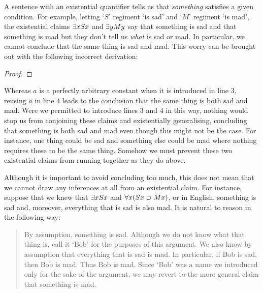 A sentence with an existential quantifier tells us that \textit{something} satisfies a given condition.
For example, letting `$S$' regiment `is sad' and `$M$' regiment `is mad', the existential claims $\exists x Sx$ and $\exists y My$ say that something is sad and that something is mad but they don't tell us \textit{what} is sad or mad.
In particular, we cannot conclude that the same thing is sad and mad.
This worry can be brought out with the following incorrect derivation:

\begin{proof}
   \pr{}
	 \pr{}
    
   
   
   
\end{proof}

Whereas $a$ is a perfectly arbitrary constant when it is introduced in line $3$, reusing $a$ in line $4$ leads to the conclusion that the same thing is both sad and mad.
Were we permitted to introduce lines $3$ and $4$ in this way, nothing would stop us from conjoining these claims and existentially generalising, concluding that something is both sad and mad even though this might not be the case.
For instance, one thing could be sad and something else could be mad where nothing requires these to be the same thing. 
Somehow we must prevent these two existential claims from running together as they do above.

Although it is important to avoid concluding too much, this does not mean that we cannot draw any inferences at all from an existential claim.
For instance, suppose that we knew that $\exists x Sx$ and $\forall x(Sx \supset Mx)$, or in English, something is sad and, moreover, everything that is sad is also mad.
It is natural to reason in the following way:

\begin{quote}
  By assumption, something is sad.
  Although we do not know what that thing is, call it `Bob' for the purposes of this argument.
  We also know by assumption that everything that is sad is mad.
  In particular, if Bob is sad, then Bob is mad.
  Thus Bob is mad.
  Since `Bob' was a name we introduced only for the sake of the argument, we may revert to the more general claim that something is mad.
\end{quote}

